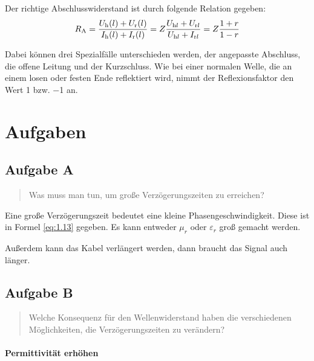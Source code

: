 Der richtige Abschlusswiderstand ist durch folgende Relation gegeben:
\begin{equation}
	\label{eq:1.17}
	R_\text A
	= \frac{U_\text h (l) + U_\text r (l)}{I_\text h (l) + I_\text r (l)}
	= Z \frac{U_{\text h l} + U_{\text r l}}{U_{\text h l} + I_{\text r l}}
	= Z \frac{1+r}{1-r}
\end{equation}

Dabei können drei Spezialfälle unterschieden werden, der angepasste Abschluss,
die offene Leitung und der Kurzschluss. Wie bei einer normalen Welle, die an
einem losen oder festen Ende reflektiert wird, nimmt der Reflexionsfaktor den
Wert \num{+1} bzw. \num{-1} an.


\section{Aufgaben}

\subsection{Aufgabe A}

\begin{quote}
	Was muss man tun, um große Verzögerungszeiten zu erreichen?
\end{quote}

Eine große Verzögerungszeit bedeutet eine kleine Phasengeschwindigkeit. Diese
ist in Formel \eqref{eq:1.13} gegeben. Es kann entweder $\mu_r$ oder
$\varepsilon_r$ groß gemacht werden.

Außerdem kann das Kabel verlängert werden, dann braucht das Signal auch länger.

\subsection{Aufgabe B}

\begin{quote}
	Welche Konsequenz für den Wellenwiderstand haben die verschiedenen
	Möglichkeiten, die Verzögerungszeiten zu verändern?
\end{quote}

\paragraph{Permittivität erhöhen}

